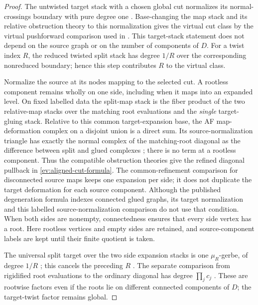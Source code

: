 \begin{proof}
The untwisted target stack with a chosen global cut normalizes its
normal-crossings boundary with pure degree one
\cite[Proposition~7.4.1]{ACFW}.  Base-changing the map stack and its
relative obstruction theory to this normalization gives the virtual
cut class by the virtual pushforward comparison used in
\cite[Sections~5.4--5.6]{AF2016}.  This target-stack statement does
not depend on the source graph or on the number of components of $D$.
For a twist index $R$, the reduced twisted split stack has degree
$1/R$ over the corresponding nonreduced boundary; hence this step
contributes $R$ to the virtual class.

Normalize the source at its nodes mapping to the selected cut.  A
rootless component remains wholly on one side, including when it
maps into an expanded level.  On fixed labelled data the split-map
stack is the fiber product of the two relative-map stacks over the
matching root evaluations and the \emph{single} target-gluing stack.
Relative to this common target-expansion base, the AF map-deformation
complex on a disjoint union is a direct sum.  Its source-normalization
triangle has exactly the normal complex of the matching-root diagonal
as the difference between split and glued complexes
\cite[Proposition~5.16]{AF2016}; there is no term at a rootless
component.  Thus the compatible obstruction theories give the
refined diagonal pullback in \eqref{ev:aligned-cut-formula}.  The
common-refinement comparison for disconnected source maps
\cite[Proposition~4.14 and its proof]{AF2016} keeps one expansion per
side; it does not duplicate the target deformation for each source
component.  Although the published degeneration formula indexes
connected glued graphs, its target normalization and this labelled
source-normalization comparison do not use that condition.  When
both sides are nonempty, connectedness ensures that every side
vertex has a root.  Here rootless vertices and empty sides are
retained, and source-component labels are kept until their finite
quotient is taken.

The universal split target over the two side expansion stacks is one
$\mu_R$-gerbe, of degree $1/R$
\cite[Proposition~7.4.2]{ACFW}; this cancels the preceding $R$
\cite[Lemma~5.15]{AF2016}.  The separate comparison from rigidified
root evaluations to the ordinary diagonal has degree
$\prod_jc_j$ \cite[Proposition~5.18]{AF2016}.  These are rootwise
factors even if the roots lie on different connected components of
$D$; the target-twist factor remains global.


\end{proof}
